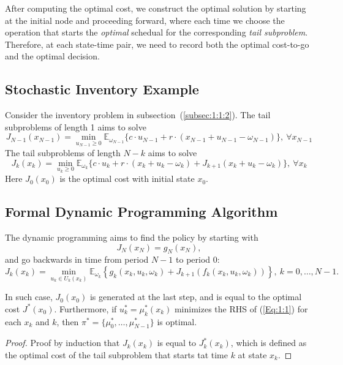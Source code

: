 After computing the optimal cost, we construct the optimal solution by starting at the initial node and proceeding forward, where each time we choose the operation that starts the \emph{optimal} schedual for the corresponding \emph{tail subproblem}. Therefore, at each state-time pair, we need to record both the optimal cost-to-go and the optimal decision.

\subsection{Stochastic Inventory Example}
Consider the inventory problem in subsection~(\ref{subsec:1:1:2}). The tail subproblems of length 1 aims to solve
\[
J_{N-1}(x_{N-1}) = \min_{u_{N-1}\ge0}\mathbb{E}_{\omega_{N-1}}
\{
c\cdot u_{N-1} + r\cdot(x_{N-1} + u_{N-1} - \omega_{N-1})
\},\ \forall x_{N-1}
\]
The tail subproblems of length $N-k$ aims to solve
\[
J_{k}(x_{k}) = \min_{u_{k}\ge0}\mathbb{E}_{\omega_{k}}
\{
c\cdot u_{k} + r\cdot(x_{k} + u_{k} - \omega_{k}) + J_{k+1}(x_k+u_k-\omega_k)
\},\ \forall x_{k}
\]
Here $J_0(x_0)$ is the optimal cost with initial state $x_0$.

\subsection{Formal Dynamic Programming Algorithm}
The dynamic programming aims to find the policy by starting with
\[
J_N(x_N) = g_N(x_N),
\]
and go backwards in time from period $N-1$ to period $0$:
\begin{equation}\label{Eq:1:1}
J_k(x_k) = \min_{u_k\in U_k(x_k)}\mathbb{E}_{\omega_k}
\left\{
g_k(x_k,u_k,\omega_k)
+
J_{k+1}(f_k(x_k,u_k,\omega_k))
\right\},\ k=0,\dots,N-1.
\end{equation}

In such case, $J_0(x_0)$ is generated at the last step, and is equal to the optimal cost $J^*(x_0)$. 
Furthermore, if $u_k^* = \mu_k^*(x_k)$ minimizes the RHS of (\ref{Eq:1:1}) for each $x_k$ and $k$, then $\pi^*=\{\mu_0^*,\dots,\mu_{N-1}^*\}$ is optimal.
\begin{proof}
Proof by induction that $J_k(x_k)$ is equal to $J_k^*(x_k)$, which is defined as the optimal cost of the tail subproblem that starts tat time $k$ at state $x_k$.
\end{proof}

